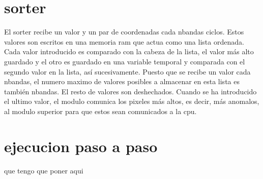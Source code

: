 \section{sorter}
 El sorter recibe un valor y un par de coordenadas cada nbandas ciclos. Estos valores son escritos en una memoria ram que actua como una lista ordenada. Cada valor introducido es comparado con la cabeza de la lista, el valor más alto guardado y el otro es guardado en una variable temporal y comparada con el segundo valor en la lista, así sucesivamente. Puesto que se recibe un valor cada nbandas, el numero maximo de valores posibles a almacenar en esta lista es también nbandas. El resto de valores son deshechados. Cuando se ha introducido el ultimo valor, el modulo comunica los pixeles más altos, es decir, más anomalos, al modulo superior para que estos sean comunicados a la cpu.
\section{ejecucion paso a paso}
que tengo que poner aqui

